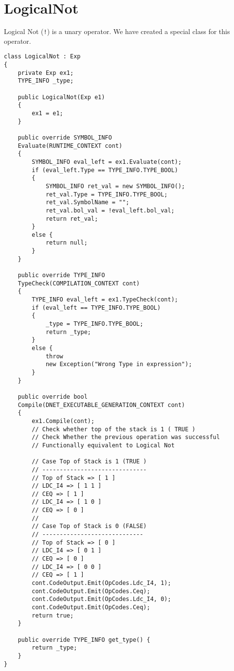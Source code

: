 \section{LogicalNot}
Logical Not (\texttt{!}) is a unary operator. We have created a special class for this operator.
\lstset{style=csharp}
\begin{lstlisting}
class LogicalNot : Exp
{
	private Exp ex1;
	TYPE_INFO _type;
	
	public LogicalNot(Exp e1)
	{
		ex1 = e1;
	}
	
	public override SYMBOL_INFO 
	Evaluate(RUNTIME_CONTEXT cont)
	{
		SYMBOL_INFO eval_left = ex1.Evaluate(cont);
		if (eval_left.Type == TYPE_INFO.TYPE_BOOL)
		{
			SYMBOL_INFO ret_val = new SYMBOL_INFO();
			ret_val.Type = TYPE_INFO.TYPE_BOOL;
			ret_val.SymbolName = "";
			ret_val.bol_val = !eval_left.bol_val;
			return ret_val;
		}
		else {
			return null;
		}
	}
 
	public override TYPE_INFO 
	TypeCheck(COMPILATION_CONTEXT cont)
	{
		TYPE_INFO eval_left = ex1.TypeCheck(cont);
		if (eval_left == TYPE_INFO.TYPE_BOOL)
		{
			_type = TYPE_INFO.TYPE_BOOL;
			return _type;
		}
		else {
			throw 
			new Exception("Wrong Type in expression");
		}
	}

	public override bool 
	Compile(DNET_EXECUTABLE_GENERATION_CONTEXT cont)
	{
		ex1.Compile(cont);
		// Check whether top of the stack is 1 ( TRUE )
		// Check Whether the previous operation was successful
		// Functionally equivalent to Logical Not

		// Case Top of Stack is 1 (TRUE )
		// ------------------------------
		// Top of Stack => [ 1 ]
		// LDC_I4 => [ 1 1 ]
		// CEQ => [ 1 ]
		// LDC_I4 => [ 1 0 ]
		// CEQ => [ 0 ]
		//
		// Case Top of Stack is 0 (FALSE)
		// -----------------------------
		// Top of Stack => [ 0 ]
		// LDC_I4 => [ 0 1 ]
		// CEQ => [ 0 ]
		// LDC_I4 => [ 0 0 ]
		// CEQ => [ 1 ]
		cont.CodeOutput.Emit(OpCodes.Ldc_I4, 1);
		cont.CodeOutput.Emit(OpCodes.Ceq);
		cont.CodeOutput.Emit(OpCodes.Ldc_I4, 0);
		cont.CodeOutput.Emit(OpCodes.Ceq);
		return true;
	}
	
	public override TYPE_INFO get_type() {
		return _type;
	}
}
\end{lstlisting}
